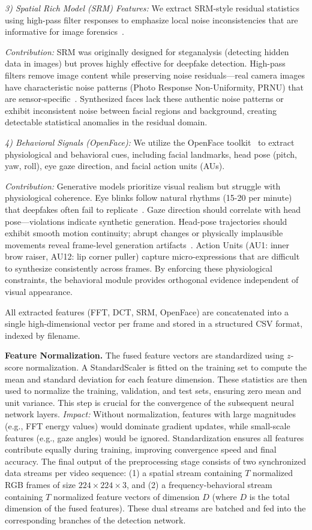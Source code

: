 \documentclass[conference]{IEEEtran}
\begin{document}
\textit{3) Spatial Rich Model (SRM) Features:} We extract SRM-style residual statistics using high-pass filter responses to emphasize local noise inconsistencies that are informative for image forensics~\cite{b19}.

\textit{Contribution:} SRM was originally designed for steganalysis (detecting hidden data in images) but proves highly effective for deepfake detection. High-pass filters remove image content while preserving noise residuals—real camera images have characteristic noise patterns (Photo Response Non-Uniformity, PRNU) that are sensor-specific~\cite{b7}. Synthesized faces lack these authentic noise patterns or exhibit inconsistent noise between facial regions and background, creating detectable statistical anomalies in the residual domain.

\textit{4) Behavioral Signals (OpenFace):} We utilize the OpenFace toolkit~\cite{b18} to extract physiological and behavioral cues, including facial landmarks, head pose (pitch, yaw, roll), eye gaze direction, and facial action units (AUs).

\textit{Contribution:} Generative models prioritize visual realism but struggle with physiological coherence. Eye blinks follow natural rhythms (15-20 per minute) that deepfakes often fail to replicate~\cite{b10}. Gaze direction should correlate with head pose—violations indicate synthetic generation. Head-pose trajectories should exhibit smooth motion continuity; abrupt changes or physically implausible movements reveal frame-level generation artifacts~\cite{b11}. Action Units (AU1: inner brow raiser, AU12: lip corner puller) capture micro-expressions that are difficult to synthesize consistently across frames. By enforcing these physiological constraints, the behavioral module provides orthogonal evidence independent of visual appearance.

All extracted features (FFT, DCT, SRM, OpenFace) are concatenated into a single high-dimensional vector per frame and stored in a structured CSV format, indexed by filename.

\textbf{Feature Normalization.} The fused feature vectors are standardized using $z$-score normalization. A StandardScaler is fitted on the training set to compute the mean and standard deviation for each feature dimension. These statistics are then used to normalize the training, validation, and test sets, ensuring zero mean and unit variance. This step is crucial for the convergence of the subsequent neural network layers. \textit{Impact:} Without normalization, features with large magnitudes (e.g., FFT energy values) would dominate gradient updates, while small-scale features (e.g., gaze angles) would be ignored. Standardization ensures all features contribute equally during training, improving convergence speed and final accuracy.
The final output of the preprocessing stage consists of two synchronized data streams per video sequence: (1) a spatial stream containing $T$ normalized RGB frames of size $224 \times 224 \times 3$, and (2) a frequency-behavioral stream containing $T$ normalized feature vectors of dimension $D$ (where $D$ is the total dimension of the fused features). These dual streams are batched and fed into the corresponding branches of the detection network.
\end{document}
